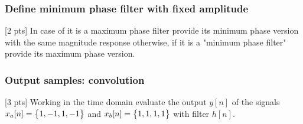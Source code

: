     \subsubsection{Define minimum phase filter with fixed amplitude}
    [2 pts] In case of it is a maximum phase filter provide its minimum phase version with the same magnitude response otherwise, if it is a "minimum phase filter" provide its maximum phase version.


    \subsubsection{Output samples: convolution}
    [3 pts] Working in the time domain evaluate the output $y[n]$ of the signals
    $x_a[n]=\begin{Bmatrix} {1,-1,1,-1} \end{Bmatrix}$ and $x_b[n]=\begin{Bmatrix} {1,1,1,1} \end{Bmatrix}$ with filter $h[n]$.

